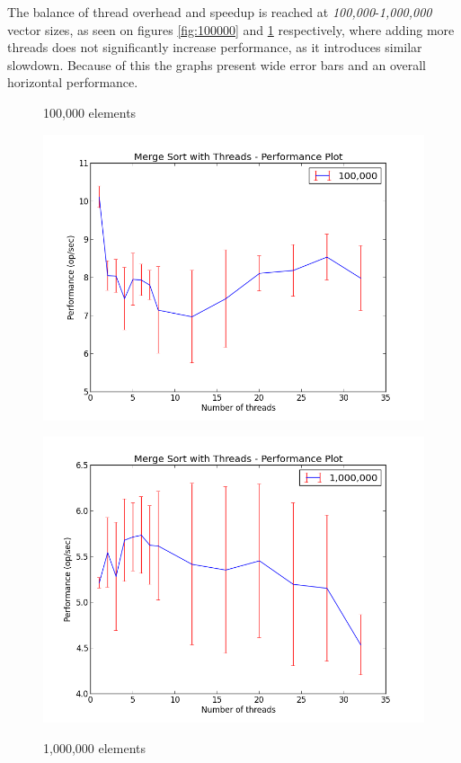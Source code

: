 \documentclass{article}
\begin{document}
  The balance of thread overhead and speedup is reached at \textit{100,000}-\textit{1,000,000} vector sizes, as seen on figures
  \ref{fig:100000} and \ref{fig:1000000} respectively, where adding more threads does not significantly increase performance, as it introduces similar slowdown. Because of this the graphs present wide error bars and an overall horizontal performance. 

  \begin{figure}
  \centering
  \begin{minipage}{0.45\textwidth}
    \caption{100,000 elements}
    \includegraphics[width=1\linewidth, natwidth=800, natheight=600]{evaluation/graphs/100000.png}
    \label{fig:100000}
  \end{minipage}
  \begin{minipage}{0.45\textwidth}
    \caption{1,000,000 elements}
    \includegraphics[width=1\linewidth, natwidth=800, natheight=600]{evaluation/graphs/1000000.png}
    \label{fig:1000000}
  \end{minipage}
  \end{figure}
\end{document}
